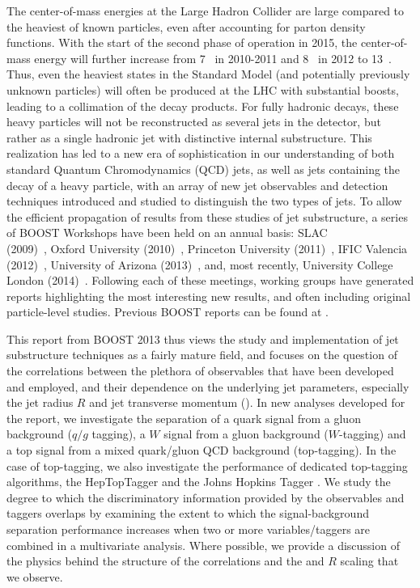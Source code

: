The center-of-mass energies at the Large Hadron Collider are large compared to the heaviest of known particles, even after accounting for parton density functions. With the start of the second phase of operation in 2015, the center-of-mass energy will further increase from 7~\tev{} in 2010-2011 and 8~\tev{} in 2012 to 13~\tev{}. Thus, even the heaviest states in the Standard Model (and potentially previously unknown particles) will often be produced at the LHC with substantial boosts, leading to a collimation of the decay products.  For fully hadronic decays, these heavy particles will not be reconstructed as several jets in the detector, but rather as a single hadronic jet with distinctive internal substructure.  This realization has led to a new era of sophistication in our understanding of both standard Quantum Chromodynamics (QCD) jets, as well as jets containing the decay of a heavy particle, with an array of new jet observables and detection techniques introduced and studied to distinguish the two types of jets.  To allow the efficient propagation of  results from these studies of jet substructure, a series of BOOST Workshops have been held on an annual basis:
SLAC\\ (2009)~\cite{Boost:2009xxold},
Oxford University (2010)~\cite{Boost:2010xxold},
Princeton University (2011)~\cite{Boost:2011xxold},
IFIC Valencia (2012)~\cite{Boost:2012xxold}, 
University of Arizona (2013)~\cite{Boost:2013xxold},
and, most recently, University College London (2014)~\cite{Boost:2014xxold}.
Following each of these meetings, working groups have generated reports
highlighting the most interesting new results, and often including original particle-level studies. Previous BOOST reports can be found at \cite{Abdesselam:2010pt,Altheimer:2012mn,Altheimer:2013yza}.

This report from BOOST 2013 thus views the study and implementation of jet substructure techniques as a fairly mature field, and focuses on the question of the correlations between the plethora of observables that have been developed and employed, and their dependence on the underlying jet parameters, especially the jet radius $R$ and jet transverse momentum (\pt). In new analyses developed for the report, we investigate the separation of a quark signal from a gluon background ($q/g$ tagging), a $W$ signal from a gluon background ($W$-tagging) and a top signal from a mixed quark/gluon QCD background (top-tagging). In the case of top-tagging, we also investigate the performance of dedicated top-tagging algorithms, the HepTopTagger \cite{Plehn:2010st} and the Johns Hopkins Tagger \cite{Kaplan:2008ie}. We study the degree to which the discriminatory information provided by the observables and taggers overlaps by examining the extent to which the signal-background separation performance increases when two or more variables/taggers are combined in a multivariate analysis. Where possible, we provide a discussion of the physics behind the structure of the correlations and the \pt and $R$ scaling that we observe. 



